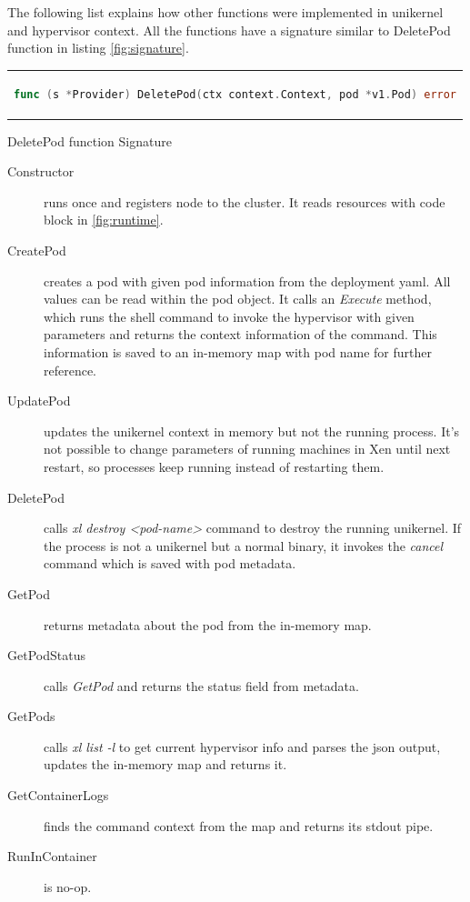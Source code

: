 

The following list explains how other functions were implemented in unikernel and hypervisor context. All the functions have a signature similar to DeletePod function in listing \ref{fig:signature}.

\begin{code}[htpb]
  \centering
  \begin{tabular}{c}
  \begin{lstlisting}[language=go]
    func (s *Provider) DeletePod(ctx context.Context, pod *v1.Pod) error
\end{lstlisting}
\end{tabular}
\caption{DeletePod function Signature}\label{fig:signature}
\end{code}


\begin{description}
  \item  [Constructor] runs once and registers node to the cluster. It reads resources with code block in \ref{fig:runtime}.
  \item [CreatePod] creates a pod with given pod information from the deployment yaml. All values can be read within the pod object. It calls an \textit{Execute} method, which runs the shell command to invoke the hypervisor with given parameters and returns the context information of the command. This information is saved to an in-memory map with pod name for further reference.
  \item [UpdatePod] updates the unikernel context in memory but not the running process. It's not possible to change parameters of running machines in Xen until next restart, so processes keep running instead of restarting them.
  \item [DeletePod] calls \textit{xl destroy <pod-name>} command to destroy the running unikernel. If the process is not a unikernel but a normal binary, it invokes the \textit{cancel} command which is saved with pod metadata.
  \item [GetPod] returns metadata about the pod from the in-memory map.
  \item [GetPodStatus] calls \textit{GetPod} and returns the status field from metadata.
  \item [GetPods] calls \textit{xl list -l} to get current hypervisor info and parses the json output, updates the in-memory map and returns it.
  \item [GetContainerLogs] finds the command context from the map and returns its stdout pipe.
  \item [RunInContainer] is no-op.

\end{description}
